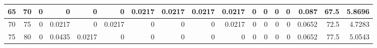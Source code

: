 \begin{table}[hb]
\begin{adjustbox}{width = \textwidth, center}
\begin{tabular}{|cc|r|r|r|r|r|r|r|r|r|r|r|r|r|r|r|}
            \cellcolor[HTML]{C8E4BE}65             & \cellcolor[HTML]{D9EAD3}70             & \cellcolor[HTML]{FFFFFF}0                      & \cellcolor[HTML]{FFFFFF}0                      & \cellcolor[HTML]{FFFFFF}0                      & \cellcolor[HTML]{FFFFFF}0                      & \cellcolor[HTML]{C7E9D8}0.0217                 & \cellcolor[HTML]{C7E9D8}0.0217                 & \cellcolor[HTML]{C7E9D8}0.0217                 & \cellcolor[HTML]{C7E9D8}0.0217                  & \cellcolor[HTML]{FFFFFF}0                       & \cellcolor[HTML]{FFFFFF}0                       & \cellcolor[HTML]{FFFFFF}0                       & \cellcolor[HTML]{FFFFFF}0                       & \cellcolor[HTML]{D9D2E9}0.087                                                   & \cellcolor[HTML]{D9D2E9}67.5                                            & \cellcolor[HTML]{D9D2E9}5.8696                                                                   \\ \hline
            \rowcolor[HTML]{FFFFFF} 
            \cellcolor[HTML]{C8E4BE}70             & \cellcolor[HTML]{D9EAD3}75             & 0                                              & \cellcolor[HTML]{C7E9D8}0.0217                 & 0                                              & \cellcolor[HTML]{C7E9D8}0.0217                 & 0                                              & 0                                              & 0                                              & \cellcolor[HTML]{C7E9D8}0.0217                  & 0                                               & 0                                               & 0                                               & 0                                               & \cellcolor[HTML]{D9D2E9}0.0652                                                  & \cellcolor[HTML]{D9D2E9}72.5                                            & \cellcolor[HTML]{D9D2E9}4.7283                                                                   \\ \hline
            \rowcolor[HTML]{FFFFFF} 
            \cellcolor[HTML]{C8E4BE}75             & \cellcolor[HTML]{D9EAD3}80             & 0                                              & \cellcolor[HTML]{8FD2B1}0.0435                 & \cellcolor[HTML]{C7E9D8}0.0217                 & 0                                              & 0                                              & 0                                              & 0                                              & 0                                               & 0                                               & 0                                               & 0                                               & 0                                               & \cellcolor[HTML]{D9D2E9}0.0652                                                  & \cellcolor[HTML]{D9D2E9}77.5                                            & \cellcolor[HTML]{D9D2E9}5.0543                                                                   \\ \hline

\end{tabular}
\end{adjustbox}
\end{table}

